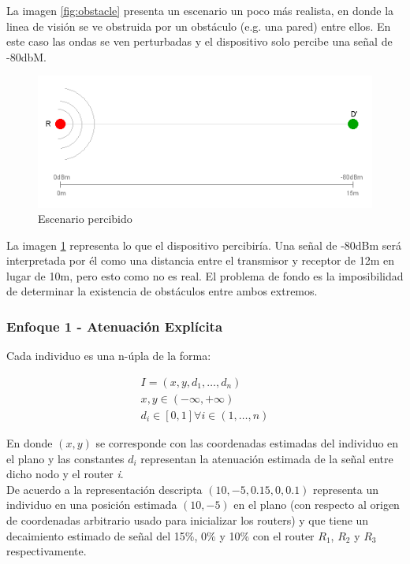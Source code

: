 \documentclass[journal]{IEEEtran}
\begin{document}
La imagen \ref{fig:obstacle} presenta un escenario un poco más realista, en donde la linea de visión se ve obstruida por un obstáculo (e.g. una pared) entre ellos. En este caso las ondas se ven perturbadas y el dispositivo solo percibe una señal de -80dbM.\\

\begin{figure}[h]
\centering
\includegraphics[width=\linewidth]{perceived.png}
\caption{Escenario percibido}
\label{fig:perceived}
\end{figure}

La imagen \ref{fig:perceived} representa lo que el dispositivo percibiría. Una señal de -80dBm será interpretada por él como una distancia entre el transmisor y receptor de 12m en lugar de 10m, pero esto como no es real. El problema de fondo es la imposibilidad de determinar la existencia de obstáculos entre ambos extremos.

\subsubsection{Enfoque 1 - Atenuación Explícita}

Cada individuo es una n-úpla de la forma:

\begin{gather*}
I = (x, y, d_1, \dots, d_n)\\
x, y \in (-\infty, +\infty)\\
d_i \in [0, 1] \forall i \in (1, \dots, n)
\end{gather*}

En donde $(x,y)$ se corresponde con las coordenadas estimadas del individuo en el plano y las constantes $d_i$ representan la atenuación estimada de la señal entre dicho nodo y el router \textit{i}.\\

De acuerdo a la representación descripta $(10, -5, 0.15, 0, 0.1)$ representa un individuo en una posición estimada $(10,-5)$ en el plano (con respecto al origen de coordenadas arbitrario usado para inicializar los routers) y que tiene un decaimiento estimado de señal del 15\%, 0\% y 10\% con el router $R_1$, $R_2$ y $R_3$ respectivamente.\\
\end{document}

